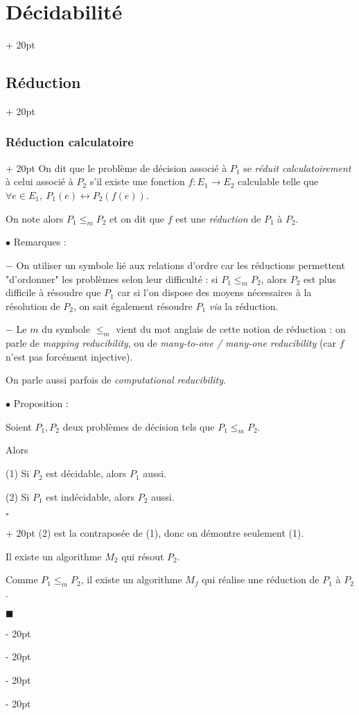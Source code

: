 \documentclass[a4paper, 12pt, twoside]{article}
\renewcommand{\le}{\leqslant}
\newcommand{\ind}[1][20pt]{\advance\leftskip + #1}
\newcommand{\deind}[1][20pt]{\advance\leftskip - #1}
\newenvironment{indt}[2][20pt]{#2 \par \ind[#1]}{\par \deind} %
\newenvironment{proof}[1][{}]{\begin{indt}{$\square$ #1}}{$\blacksquare$ \end{indt}}
\begin{document}
\begin{indt}{\section{Décidabilité}}
\begin{indt}{\subsection{Réduction}}
\begin{indt}{\subsubsection{Réduction calculatoire}}
                On dit que le problème de décision associé à $P_1$ se \emph{réduit calculatoirement} à celui associé à $P_2$ s'il existe une fonction $f : E_1 \longrightarrow E_2$ calculable telle que $\forall e \in E_1,\ P_1(e) \leftrightarrow P_2(f(e))$.

                On note alors $P_1 \le_m P_2$ et on dit que $f$ est une \emph{réduction} de $P_1$ à $P_2$.

                \vspace{12pt}
                
                $\bullet$ Remarques :

                $-$ On utiliser un symbole lié aux relations d'ordre car les réductions permettent "d'ordonner" les problèmes selon leur difficulté : si $P_1 \le_m P_2$, alors $P_2$ est plus difficile à résoudre que $P_1$ car si l'on dispose des moyens nécessaires à la résolution de $P_2$, on sait également résoudre $P_1$ \textit{via} la réduction.

                $-$ Le $m$ du symbole $\le_m$ vient du mot anglais de cette notion de réduction : on parle de \emph{mapping reducibility}, ou de \emph{many-to-one / many-one reducibility} (car $f$ n'est pas forcément injective).

                On parle aussi parfois de \emph{computational reducibility}.

                \vspace{12pt}
                
                $\bullet$ Proposition :
                \begin{emphBox}
                    Soient $P_1, P_2$ deux problèmes de décision tels que $P_1 \le_m P_2$.

                    Alors

                    (1) Si $P_2$ est décidable, alors $P_1$ aussi.

                    (2) Si $P_1$ est indécidable, alors $P_2$ aussi.
                \end{emphBox}

                \vspace{6pt}
                
                \begin{proof}
                    (2) est la contraposée de (1), donc on démontre seulement (1).

                    Il existe un algorithme $M_2$ qui résout $P_2$.

                    Comme $P_1 \le_m P_2$, il existe un algorithme $M_f$ qui réalise une réduction de $P_1$ à $P_2$.


\end{proof}
\end{indt}
\end{indt}
\end{indt}
\end{document}

